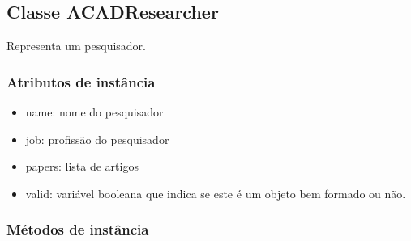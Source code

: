 \subsection{Classe ACADResearcher}

Representa um pesquisador.

\subsubsection{Atributos de instância}

\begin{itemize}
  \item name: nome do pesquisador

  \item job: profissão do pesquisador

  \item papers: lista de artigos

  \item valid: variável booleana que indica se este é um objeto bem formado ou não.

\end{itemize}

\subsubsection{Métodos de instância}


